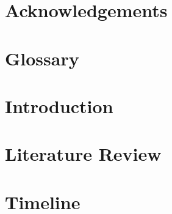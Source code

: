\documentclass[oneside, 12pt]{book}
\begin{document}
    \chapter{Acknowledgements}
        
    \chapter{Glossary}
        

\mainmatter
    \chapter{Introduction}
        
    \chapter{Literature Review}
        
    \chapter{Timeline}
        



\end{document}
